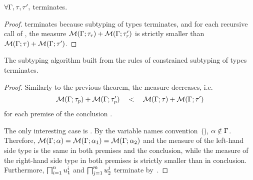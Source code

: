 
\begin{lemma}%
\label{lem:meet-terminates}
    $\forall \Gamma, \tau, \tau',$
     terminates.
\end{lemma}
\begin{proof}
     terminates because subtyping of types terminates,
    and for each recursive call  of 
    , the measure $\operatorname{\mathcal{M}}(\Gamma;\tau_r) + \operatorname{\mathcal{M}}(\Gamma;\tau'_r)$ 
    is strictly smaller than $\operatorname{\mathcal{M}}(\Gamma;\tau) + \operatorname{\mathcal{M}}(\Gamma;\tau')$.
\end{proof}

\begin{theorem}%
\label{thm:subtyctr-terminates}
    The subtyping algorithm built from the rules of
    constrained subtyping of types
     terminates.
\end{theorem}
\begin{proof}
    Similarly to the previous theorem, the measure decreases, i.e.
    \[\operatorname{\mathcal{M}}(\Gamma;\tau_p) + \operatorname{\mathcal{M}}(\Gamma;\tau'_p) \quad<\quad 
    \operatorname{\mathcal{M}}(\Gamma;\tau) + \operatorname{\mathcal{M}}(\Gamma;\tau')\]
    for each premise 
    of the conclusion .
    
    The only interesting case is .
    By the variable names convention~(), $\alpha \notin \Gamma$.
    Therefore, $\operatorname{\mathcal{M}}(\Gamma;\alpha) = \operatorname{\mathcal{M}}(\Gamma;\alpha_1) = \operatorname{\mathcal{M}}(\Gamma;\alpha_2)$
    and the measure of the left-hand side type is the same in both premises
    and the conclusion,
    while the measure of the right-hand side type in both premises 
    is strictly smaller than in conclusion.
    Furthermore, $\textstyle\bigsqcap_{i=1}^n u_1^i$ and $\textstyle\bigsqcap_{j=1}^m u_2^j$
    terminate by~.
\end{proof}

